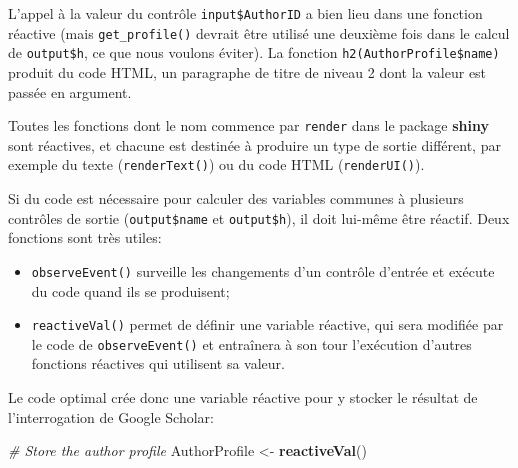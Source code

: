 \documentclass[
  12pt,
  french,
  a4paper,
  extrafontsizes,onecolumn,openright
  ]{memoir}
\newenvironment{Shaded}{\begin{snugshade}}{\end{snugshade}}
\newcommand{\CommentTok}[1]{\textcolor[rgb]{0.56,0.35,0.01}{\textit{#1}}}
\newcommand{\KeywordTok}[1]{\textcolor[rgb]{0.13,0.29,0.53}{\textbf{#1}}}
\newcommand{\NormalTok}[1]{#1}
\newcommand{\OperatorTok}[1]{\textcolor[rgb]{0.81,0.36,0.00}{\textbf{#1}}}
\newcommand{\StringTok}[1]{\textcolor[rgb]{0.31,0.60,0.02}{#1}}
\providecommand{\tightlist}{%
  \setlength{\itemsep}{0pt}\setlength{\parskip}{0pt}}
\begin{document}
\begin{Shaded}
\end{Shaded}

\normalsize

L'appel à la valeur du contrôle \texttt{input\$AuthorID} a bien lieu dans une fonction réactive (mais \texttt{get\_profile()} devrait être utilisé une deuxième fois dans le calcul de \texttt{output\$h}, ce que nous voulons éviter).
La fonction \texttt{h2(AuthorProfile\$name)} produit du code HTML, un paragraphe de titre de niveau 2 dont la valeur est passée en argument.

Toutes les fonctions dont le nom commence par \texttt{render} dans le package \textbf{shiny} sont réactives, et chacune est destinée à produire un type de sortie différent, par exemple du texte (\texttt{renderText()}) ou du code HTML (\texttt{renderUI()}).

Si du code est nécessaire pour calculer des variables communes à plusieurs contrôles de sortie (\texttt{output\$name} et \texttt{output\$h}), il doit lui-même être réactif.
Deux fonctions sont très utiles:

\begin{itemize}
\tightlist
\item
  \texttt{observeEvent()} surveille les changements d'un contrôle d'entrée et exécute du code quand ils se produisent;
\item
  \texttt{reactiveVal()} permet de définir une variable réactive, qui sera modifiée par le code de \texttt{observeEvent()} et entraînera à son tour l'exécution d'autres fonctions réactives qui utilisent sa valeur.
\end{itemize}

Le code optimal crée donc une variable réactive pour y stocker le résultat de l'interrogation de Google Scholar:

\scriptsize

\begin{Shaded}
\begin{Highlighting}[]
\CommentTok{# Store the author profile}
\NormalTok{AuthorProfile <-}\StringTok{ }\KeywordTok{reactiveVal}\NormalTok{()}
\end{Highlighting}
\end{Shaded}
\end{document}
